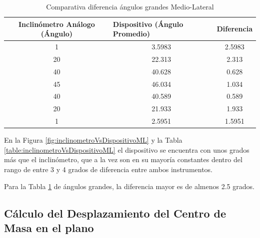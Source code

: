 \documentclass[12pt,a4paper]{article}
\begin{document}
\begin{table}[H]
	\centering
	\begin{tabular}{|c|c|c|}
		\hline
		\textbf{Inclinómetro Análogo (Ángulo)} & \multicolumn{1}{l|}{\textbf{Dispositivo (Ángulo Promedio)}} & Diferencia				 \\ \hline
		1                                      & 3.5983                                                      & 2.5983                     \\ \hline
		20                                     & 22.313                                                      & 2.313                     \\ \hline
		40                                     & 40.628                                                      & 0.628                    \\ \hline
		45                                     & 46.034                                                      & 1.034                      \\ \hline
		40                                     & 40.589                                                      & 0.589                     \\ \hline
		20                                     & 21.933                                                      & 1.933                      \\ \hline
		1                                      & 2.5951                                                      & 1.5951                    \\ \hline
	\end{tabular}
	\caption{Comparativa diferencia ángulos grandes Medio-Lateral}
	\label{table:inclinometroVsDispositivoMLD}
\end{table}

En la Figura \ref{fig:inclinometroVsDispositivoML} y la Tabla \ref{table:inclinometroVsDispositivoML} el dispositivo se encuentra con unos grados más que el inclinómetro, que a la vez son en su mayoría constantes dentro del rango de entre 3 y 4 grados de diferencia entre ambos instrumentos.

Para la Tabla \ref{table:inclinometroVsDispositivoMLD} de ángulos grandes, la diferencia mayor es de almenos 2.5 grados.
 
\newpage
\subsection{Cálculo del Desplazamiento del Centro de Masa en el plano}
\end{document}
